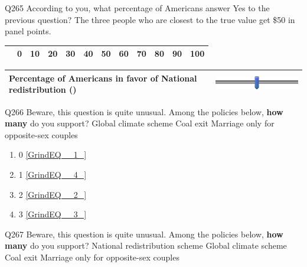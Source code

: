 \documentclass{article} %
\begin{document}
\noindent 

\noindent Q265 According to you, what percentage of Americans answer Yes to the previous question? The three people who are closest to the true value get \$50 in panel points.

\begin{tabular}{|p{2.2in}|p{0.2in}|p{0.2in}|p{0.2in}|p{0.2in}|p{0.2in}|p{0.2in}|p{0.2in}|p{0.2in}|p{0.2in}|p{0.2in}|p{0.2in}|} \hline 
 & 0 & 10 & 20 & 30 & 40 & 50 & 60 & 70 & 80 & 90 & 100 \\ \hline 
\end{tabular}



\begin{tabular}{|p{2.2in}|p{2.2in}|} \hline 
Percentage of Americans in favor of National redistribution () & \includegraphics*[width=2.08in, height=0.33in]{image8} \\ \hline 
\end{tabular}



\noindent 

\noindent 

\noindent 

\noindent Q266 Beware, this question is quite unusual. Among the policies below, \textbf{how many} do you support?   Global climate scheme  Coal exit  Marriage only for opposite-sex couples 

\begin{enumerate}
\item  0  \eqref{GrindEQ__1_} 

\item  1  \eqref{GrindEQ__4_} 

\item  2  \eqref{GrindEQ__2_} 

\item  3  \eqref{GrindEQ__3_} 
\end{enumerate}

\noindent 

\noindent 

\noindent 

\noindent Q267 Beware, this question is quite unusual. Among the policies below, \textbf{how many} do you support?   National redistribution scheme  Global climate scheme  Coal exit  Marriage only for opposite-sex couples 
\end{document}
